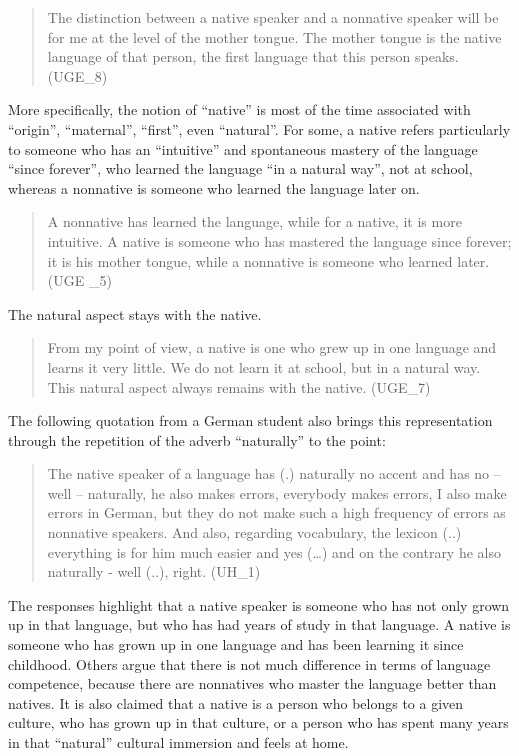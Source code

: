 \documentclass[output=paper]{../langscibook}
\begin{document}
\begin{quote}
The distinction between a native speaker and a nonnative speaker will be for me at the level of the mother tongue. The mother tongue is the native language of that person, the first language that this person speaks. (UGE\_8)
\end{quote}

More specifically, the notion of “native” is most of the time associated with “origin”, “maternal”, “first”, even “natural”. For some, a native refers particularly to someone who has an “intuitive” and spontaneous mastery of the language “since forever”, who learned the language “in a natural way”, not at school, where\-as a nonnative is someone who learned the language later on. 

\begin{quote}
A nonnative has learned the language, while for a native, it is more intuitive. A native is someone who has mastered the language since forever; it is his mother tongue, while a nonnative is someone who learned later. (UGE \_5)
\end{quote}

\noindent The natural aspect stays with the native.

\begin{quote}
From my point of view, a native is one who grew up in one language and learns it very little. We do not learn it at school, but in a natural way. This natural aspect always remains with the native. (UGE\_7)
\end{quote}

The following quotation from a German student also brings this representation through the repetition of the adverb “naturally” to the point:

\begin{quote}
The native speaker of a language has (.) naturally no accent and has no – well – naturally, he also makes errors, everybody makes errors, I also make errors in German, but they do not make such a high frequency of errors as nonnative speakers. And also, regarding vocabulary, the lexicon (..) everything is for him much easier  and yes (…) and on the contrary he also naturally - well (..), right. (UH\_1)
\end{quote}

The responses highlight that a native speaker is someone who has not only grown up in that language, but who has had years of study in that language. A native is someone who has grown up in one language and has been learning it since childhood. Others argue that there is not much difference in terms of language competence, because there are nonnatives who master the language better than natives. It is also claimed that a native is a person who belongs to a given culture, who has grown up in that culture, or a person who has spent many years in that “natural” cultural immersion and feels at home. 
\end{document}
